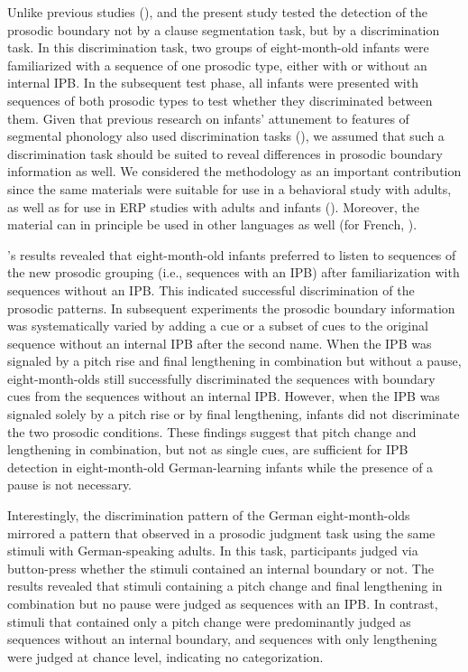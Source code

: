 \documentclass[output=paper]{langscibook}
\begin{document}
Unlike previous studies (\citealt{Johnson2008, Nazzi2000, Seidl2007}), \citet{Wellmann2012} and the present study tested the detection of the prosodic boundary not by a clause segmentation task, but by a discrimination task. In this discrimination task, two groups of eight-month-old infants were familiarized with a sequence of one prosodic type, either with or without an internal IPB. In the subsequent test phase, all infants were presented with sequences of both prosodic types to test whether they discriminated between them. Given that previous research on infants’ attunement to features of segmental phonology also used discrimination tasks (\citealt{Mattock2006, Mattock2008, Polka1994, Werker1984}), we assumed that such a discrimination task should be suited to reveal differences in prosodic boundary information as well. We considered the methodology as an important contribution since the same materials were suitable for use in a behavioral study with adults, as well as for use in ERP studies with adults and infants (\citealt{Holzgrefe-Lang2016, Holzgrefe-Lang2018}). Moreover, the material can in principle be used in other languages as well (for French, \citealt{VanOmmen2020}).

\begin{sloppypar}
\citet{Wellmann2012}'s results revealed that eight-month-old infants preferred to listen to sequences of the new prosodic grouping (i.e., sequences with an IPB) after familiarization with sequences without an IPB. This indicated successful discrimination of the prosodic patterns. In subsequent experiments the prosodic boundary information was systematically varied by adding a cue or a subset of cues to the original sequence without an internal IPB after the second name. When the IPB was signaled by a pitch rise and final lengthening in combination but without a pause, eight-month-olds still successfully discriminated the sequences with boundary cues from the sequences without an internal IPB. However, when the IPB was signaled solely by a pitch rise or by final lengthening, infants did not discriminate the two prosodic conditions. These findings suggest that pitch change and lengthening in combination, but not as single cues, are sufficient for IPB detection in eight-month-old German-learning infants while the presence of a pause is not necessary.
\end{sloppypar}

Interestingly, the discrimination pattern of the German eight-month-olds mirrored a pattern that \citet{Holzgrefe-Lang2016} observed in a prosodic judgment task using the same stimuli with German-speaking adults. In this task, participants judged via button-press whether the stimuli contained an internal boundary or not. The results revealed that stimuli containing a pitch change and final lengthening in combination but no pause were judged as sequences with an IPB. In contrast, stimuli that contained only a pitch change were predominantly judged as sequences without an internal boundary, and sequences with only lengthening were judged at chance level, indicating no categorization.
\end{document}
